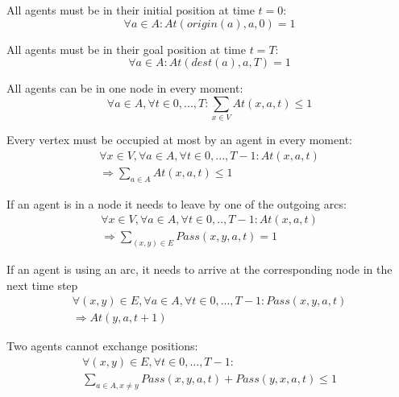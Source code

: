 \documentclass[12pt, a4paper, hidelinks]{article}
\numberwithin{equation}{section}
\begin{document}
\begin{description}
\item All agents must be in their initial position at time $t = 0$:
\begin{equation}
\forall a \in A: At(origin(a), a, 0) = 1
\label{eq:c1}\end{equation}

\item All agents must be in their goal position at time $t = T$:
\begin{equation}
\forall a \in A : At(dest(a), a, T) = 1
\label{eq:c2}\end{equation}

\item All agents can be in one node in every moment:
\begin{equation}
\forall a \in A, \forall t \in {0,...,T}: \displaystyle\sum_{x \in V}At(x,a,t)\leq1
\label{eq:c3}\end{equation}

\item Every vertex must be occupied at most by an agent in every moment:
\begin{equation}\begin{split}
\forall x \in V, \forall a \in A, \forall t \in {0,...,T-1}: At(x, a, t) \\ 
\Rightarrow \displaystyle\sum_{a \in A}At(x,a,t)\leq1
\end{split}\label{eq:c4}\end{equation}

\item If an agent is in a node it needs to leave by one of the outgoing arcs:
\begin{equation}\begin{split}
\forall x \in V, \forall a \in A, \forall t \in {0,..,T-1}: At(x,a,t) \\
\Rightarrow  \displaystyle\sum_{(x,y) \in E}Pass(x,y,a,t)=1
\end{split}\label{eq:c5}\end{equation}

\item If an agent is using an arc, it needs to arrive at the corresponding node in the next time step
\begin{equation}\begin{split}
\forall (x,y) \in E, \forall a \in A, \forall t \in {0,...,T-1}: Pass(x,y,a,t) \\
\Rightarrow At(y,a,t+1)
\end{split}\label{eq:c6}
\end{equation}

\item Two agents cannot exchange positions:
\begin{equation}\begin{split}
\forall (x,y) \in E, \forall t \in {0,...,T-1}: \\
\displaystyle\sum_{a \in A, x \neq y}Pass(x,y,a,t) + Pass(y,x,a,t) \leq 1
\end{split}\label{eq:c7}\end{equation}
\end{description}
\end{document}
